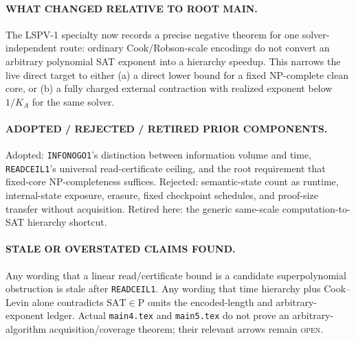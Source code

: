 \documentclass[11pt]{article}
\newcommand{\OPEN}{\textsc{open}}
\begin{document}
\paragraph{WHAT CHANGED RELATIVE TO ROOT MAIN.}
The LSPV-1 specialty now records a precise negative theorem for one solver-independent
route: ordinary Cook/Robson-scale encodings do not convert an arbitrary polynomial
SAT exponent into a hierarchy speedup.  This narrows the live direct target to either
(a) a direct lower bound for a fixed NP-complete clean core, or (b) a fully charged
external contraction with realized exponent below $1/K_A$ for the same solver.

\paragraph{ADOPTED / REJECTED / RETIRED PRIOR COMPONENTS.}
Adopted: \texttt{INFONOGO1}'s distinction between information volume and time,
\texttt{READCEIL1}'s universal read-certificate ceiling, and the root requirement
that fixed-core NP-completeness suffices.  Rejected: semantic-state count as runtime,
internal-state exposure, erasure, fixed checkpoint schedules, and proof-size transfer
without acquisition.  Retired here: the generic same-scale computation-to-SAT
hierarchy shortcut.

\paragraph{STALE OR OVERSTATED CLAIMS FOUND.}
Any wording that a linear read/certificate bound is a candidate superpolynomial
obstruction is stale after \texttt{READCEIL1}.  Any wording that time hierarchy plus
Cook--Levin alone contradicts $\mathrm{SAT}\in\mathrm P$ omits the encoded-length and
arbitrary-exponent ledger.  Actual \texttt{main4.tex} and \texttt{main5.tex} do not
prove an arbitrary-algorithm acquisition/coverage theorem; their relevant arrows
remain \OPEN{}.
\end{document}
